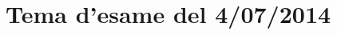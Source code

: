 \documentclass[main.tex]{subfiles}
\begin{document}
\section{Tema d'esame del 4/07/2014}

%

%
\end{document}
